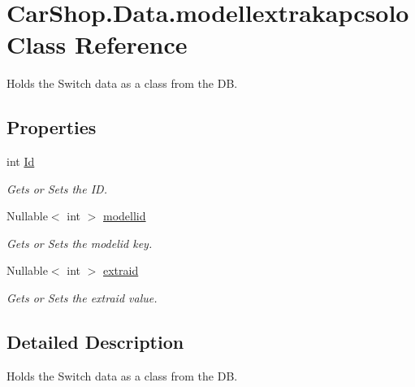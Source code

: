 \hypertarget{class_car_shop_1_1_data_1_1modellextrakapcsolo}{}\section{Car\+Shop.\+Data.\+modellextrakapcsolo Class Reference}
\label{class_car_shop_1_1_data_1_1modellextrakapcsolo}


Holds the Switch data as a class from the DB.  


\subsection*{Properties}
\begin{DoxyCompactItemize}
\item 
int \mbox{\hyperlink{class_car_shop_1_1_data_1_1modellextrakapcsolo_a285cca2610d4b8910d72ffda81f7da54}{Id}}
\begin{DoxyCompactList}\small\item\em Gets or Sets the ID. \end{DoxyCompactList}\item 
Nullable$<$ int $>$ \mbox{\hyperlink{class_car_shop_1_1_data_1_1modellextrakapcsolo_a452a93d3e2e78f1cc6daac6fa6f85696}{modellid}}
\begin{DoxyCompactList}\small\item\em Gets or Sets the modelid key. \end{DoxyCompactList}\item 
Nullable$<$ int $>$ \mbox{\hyperlink{class_car_shop_1_1_data_1_1modellextrakapcsolo_a2fa5a24bfb64edb79affa915c66e98f0}{extraid}}
\begin{DoxyCompactList}\small\item\em Gets or Sets the extraid value. \end{DoxyCompactList}\end{DoxyCompactItemize}


\subsection{Detailed Description}
Holds the Switch data as a class from the DB. 



